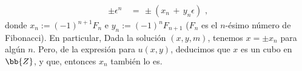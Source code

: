 \begin{align*}
\pm\epsilon^{n} & \,=\,\pm(x_{n}\,+\,y_{n}\epsilon)\text{ ,}
\end{align*}
donde $x_{n}:=(-1)^{n+1}F_{n}$ e $y_{n}:=(-1)^{n}F_{n+1}$
($F_{n}$ es el $n$-\'{e}simo n\'{u}mero de Fibonacci). En particular,
Dada la soluci\'{o}n $(x,y,m)$, tenemos $x=\pm x_{n}$ para alg\'{u}n
$n$. Pero, de la expresi\'{o}n para $u(x,y)$, deducimos que $x$ es un
cubo en $\bb{Z}$, y que, entonces $x_{n}$ tambi\'{e}n lo es.